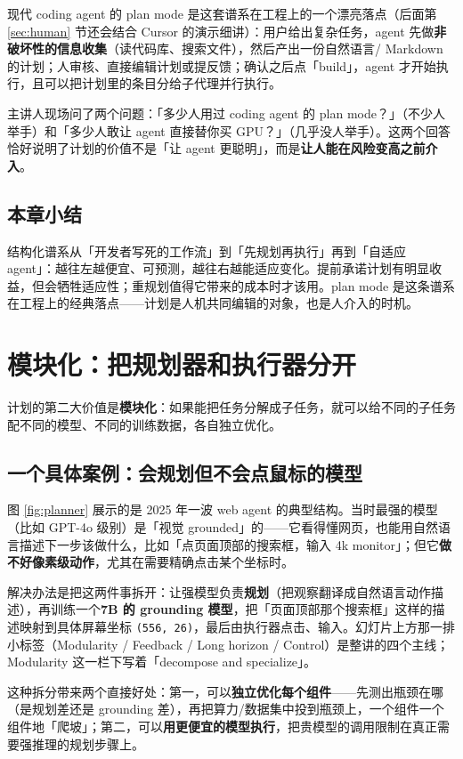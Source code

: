 \documentclass[a4paper]{article}
\begin{document}
现代 coding agent 的 plan mode 是这套谱系在工程上的一个漂亮落点（后面第 \ref{sec:human} 节还会结合 Cursor 的演示细讲）：用户给出复杂任务，agent 先做\textbf{非破坏性的信息收集}（读代码库、搜索文件），然后产出一份自然语言/ Markdown 的计划；人审核、直接编辑计划或提反馈；确认之后点「build」，agent 才开始执行，且可以把计划里的条目分给子代理并行执行。

主讲人现场问了两个问题：「多少人用过 coding agent 的 plan mode？」（不少人举手）和「多少人敢让 agent 直接替你买 GPU？」（几乎没人举手）。这两个回答恰好说明了计划的价值不是「让 agent 更聪明」，而是\textbf{让人能在风险变高之前介入}。

\subsection{本章小结}
结构化谱系从「开发者写死的工作流」到「先规划再执行」再到「自适应 agent」：越往左越便宜、可预测，越往右越能适应变化。提前承诺计划有明显收益，但会牺牲适应性；重规划值得它带来的成本时才该用。plan mode 是这条谱系在工程上的经典落点——计划是人机共同编辑的对象，也是人介入的时机。

\section{模块化：把规划器和执行器分开}

计划的第二大价值是\textbf{模块化}：如果能把任务分解成子任务，就可以给不同的子任务配不同的模型、不同的训练数据，各自独立优化。

\subsection{一个具体案例：会规划但不会点鼠标的模型}

图 \ref{fig:planner} 展示的是 2025 年一波 web agent 的典型结构。当时最强的模型（比如 GPT-4o 级别）是「视觉 grounded」的——它看得懂网页，也能用自然语言描述下一步该做什么，比如「点页面顶部的搜索框，输入 4k monitor」；但它\textbf{做不好像素级动作}，尤其在需要精确点击某个坐标时。

解决办法是把这两件事拆开：让强模型负责\textbf{规划}（把观察翻译成自然语言动作描述），再训练一个\textbf{7B 的 grounding 模型}，把「页面顶部那个搜索框」这样的描述映射到具体屏幕坐标 \texttt{(556, 26)}，最后由执行器点击、输入。幻灯片上方那一排小标签（Modularity / Feedback / Long horizon / Control）是整讲的四个主线；Modularity 这一栏下写着「decompose and specialize」。

这种拆分带来两个直接好处：第一，可以\textbf{独立优化每个组件}——先测出瓶颈在哪（是规划差还是 grounding 差），再把算力/数据集中投到瓶颈上，一个组件一个组件地「爬坡」；第二，可以\textbf{用更便宜的模型执行}，把贵模型的调用限制在真正需要强推理的规划步骤上。
\end{document}
